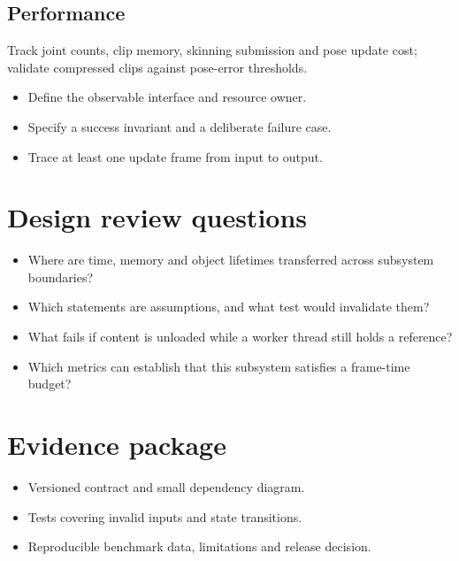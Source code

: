 \documentclass[11pt,letterpaper]{article}
\begin{document}
\subsection{Performance}
Track joint counts, clip memory, skinning submission and pose update cost; validate compressed clips against pose-error thresholds.

\begin{itemize}
\item Define the observable interface and resource owner.
\item Specify a success invariant and a deliberate failure case.
\item Trace at least one update frame from input to output.
\end{itemize}
\section{Design review questions}
\begin{itemize}
\item Where are time, memory and object lifetimes transferred across subsystem boundaries?
\item Which statements are assumptions, and what test would invalidate them?
\item What fails if content is unloaded while a worker thread still holds a reference?
\item Which metrics can establish that this subsystem satisfies a frame-time budget?
\end{itemize}
\section{Evidence package}
\begin{itemize}
\item Versioned contract and small dependency diagram.
\item Tests covering invalid inputs and state transitions.
\item Reproducible benchmark data, limitations and release decision.
\end{itemize}
\end{document}
